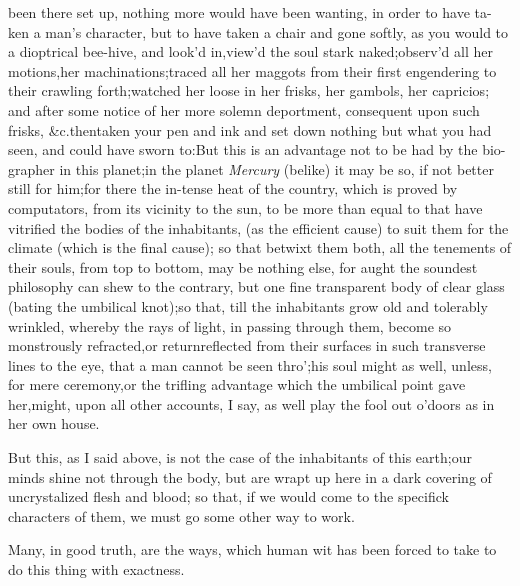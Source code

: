 \documentclass{article}
\begin{document}
\noindent
{}
been there set up,
nothing more would have been wanting, in order to have ta- ken a
man’s character, but to have taken a chair and gone softly,
as you would to a dioptrical bee-hive, and look’d
in,\tsk\break view’d the soul stark naked;\tsk  observ’d all her
motions,\tsk  her machinations;\tsk\break  traced all her maggots from
their first engendering to their crawling forth;\tsk\break  watched her
loose in her frisks, her gambols, her capricios; and after some
notice of her more solemn deportment, consequent upon such frisks,
\&c.\tsh  then\break taken your pen and ink and set down
nothing but what you had seen, and\break
could have sworn to:\tsk  But this is an\break
advantage not to be had by the bio-\break
grapher in this
planet;\tsk  in the planet \textit{Mercury} (belike) it may be so, if not\break
better still for him;\tsh  for there the in-\break tense heat of the country, which is
pro\-ved by computators,
from its vicinity to the sun, to be more than equal to that
have vitrified the
bodies of the inhabitants, (as the efficient cause) to suit them
for the climate (which is the final cause); so that betwixt them
both, all the tenements of their souls, from top to bottom, may
be nothing else, for aught the soundest philosophy can shew to
the contrary, but one fine transparent body of clear glass
(bating the umbilical knot);\tsk\break  so that, till the inhabitants
grow old and tolerably wrinkled, whereby the rays of light, in
passing through them, become so monstrously refracted,\tsh  or
return\break reflected from their surfaces in such\break
transverse lines to
the eye, that a man cannot be seen thro’;\tsk  his soul might
as well, unless, for mere ceremony,\tsk or the trifling advantage
which the umbilical point gave her,\tsk  might, upon all other
accounts, I say, as well play the fool out o’doors as in her own
house.

But this, as I said above, is not the case of the inhabitants of
this earth;\tsk  our minds shine not through the body, but are wrapt
up here in a dark covering of uncrystalized flesh and blood; so
that, if we would come to the specifick characters of them, we must
go some other way to work.

Many, in good truth, are the ways, which human wit has been
forced to take to do this thing with exactness.
\end{document}
